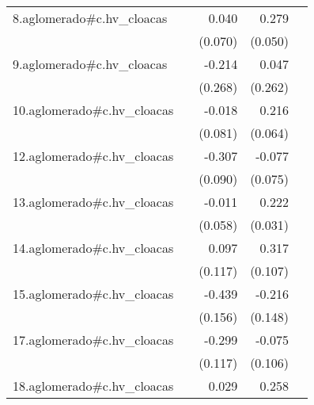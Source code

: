 {\begin{longtable}{l*{4}{D{.}{.}{-1}}}
\addlinespace
8.aglomerado#c.hv\_cloacas&                     &       0.040         &       0.279\sym{***}&                     \\
            &                     &     (0.070)         &     (0.050)         &                     \\
\addlinespace
9.aglomerado#c.hv\_cloacas&                     &      -0.214         &       0.047         &                     \\
            &                     &     (0.268)         &     (0.262)         &                     \\
\addlinespace
10.aglomerado#c.hv\_cloacas&                     &      -0.018         &       0.216\sym{***}&                     \\
            &                     &     (0.081)         &     (0.064)         &                     \\
\addlinespace
12.aglomerado#c.hv\_cloacas&                     &      -0.307\sym{***}&      -0.077         &                     \\
            &                     &     (0.090)         &     (0.075)         &                     \\
\addlinespace
13.aglomerado#c.hv\_cloacas&                     &      -0.011         &       0.222\sym{***}&                     \\
            &                     &     (0.058)         &     (0.031)         &                     \\
\addlinespace
14.aglomerado#c.hv\_cloacas&                     &       0.097         &       0.317\sym{**} &                     \\
            &                     &     (0.117)         &     (0.107)         &                     \\
\addlinespace
15.aglomerado#c.hv\_cloacas&                     &      -0.439\sym{**} &      -0.216         &                     \\
            &                     &     (0.156)         &     (0.148)         &                     \\
\addlinespace
17.aglomerado#c.hv\_cloacas&                     &      -0.299\sym{*}  &      -0.075         &                     \\
            &                     &     (0.117)         &     (0.106)         &                     \\
\addlinespace
18.aglomerado#c.hv\_cloacas&                     &       0.029         &       0.258\sym{***}&                     \\

\end{longtable}}
